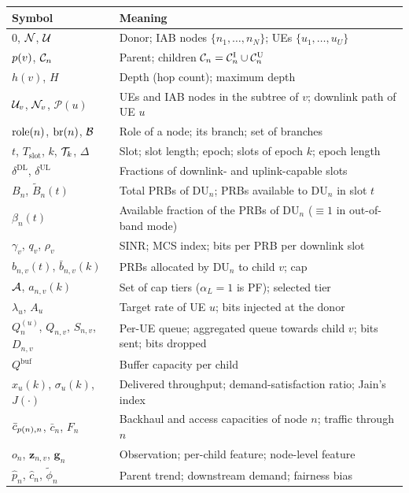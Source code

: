 \begin{EnChapter}
\begin{longtable}{@{}p{}p{}@{}}
\toprule
Symbol & Meaning \\
\midrule
\endhead
$0$, $\mathcal{N}$, $\mathcal{U}$ & Donor; IAB nodes $\{n_1,\dots,n_N\}$; UEs $\{u_1,\dots,u_U\}$ \\
$p(v)$, $\mathcal{C}_n$ & Parent; children $\mathcal{C}_n = \mathcal{C}_n^{\mathrm{I}} \cup \mathcal{C}_n^{\mathrm{U}}$ \\
$h(v)$, $H$ & Depth (hop count); maximum depth \\
$\mathcal{U}_v$, $\mathcal{N}_v$, $\mathcal{P}(u)$ & UEs and IAB nodes in the subtree of $v$; downlink path of UE $u$ \\
$\operatorname{role}(n)$, $\operatorname{br}(n)$, $\mathcal{B}$ & Role of a node; its branch; set of branches \\
$t$, $T_{\mathrm{slot}}$, $k$, $\mathcal{T}_k$, $\Delta$ & Slot; slot length; epoch; slots of epoch $k$; epoch length \\
$\delta^{\mathrm{DL}}$, $\delta^{\mathrm{UL}}$ & Fractions of downlink- and uplink-capable slots \\
$B_n$, $\tilde B_n(t)$ & Total PRBs of DU$_n$; PRBs available to DU$_n$ in slot $t$ \\
$\beta_n(t)$ & Available fraction of the PRBs of DU$_n$ ($\equiv 1$ in out-of-band mode) \\
$\gamma_v$, $q_v$, $\rho_v$ & SINR; MCS index; bits per PRB per downlink slot \\
$b_{n,v}(t)$, $\bar b_{n,v}(k)$ & PRBs allocated by DU$_n$ to child $v$; cap \\
$\mathcal{A}$, $a_{n,v}(k)$ & Set of cap tiers ($\alpha_L = 1$ is PF); selected tier \\
$\lambda_u$, $A_u$ & Target rate of UE $u$; bits injected at the donor \\
$Q_n^{(u)}$, $Q_{n,v}$, $S_{n,v}$, $D_{n,v}$ & Per-UE queue; aggregated queue towards child $v$; bits sent; bits dropped \\
$Q^{\mathrm{buf}}$ & Buffer capacity per child \\
$x_u(k)$, $\sigma_u(k)$, $J(\cdot)$ & Delivered throughput; demand-satisfaction ratio; Jain's index \\
$\bar c_{p(n),n}$, $\bar c_n$, $F_n$ & Backhaul and access capacities of node $n$; traffic through $n$ \\
$o_n$, $\bm z_{n,v}$, $\bm g_n$ & Observation; per-child feature; node-level feature \\
$\hat p_n$, $\hat c_n$, $\tilde\phi_n$ & Parent trend; downstream demand; fairness bias \\

\end{longtable}
\end{EnChapter}
